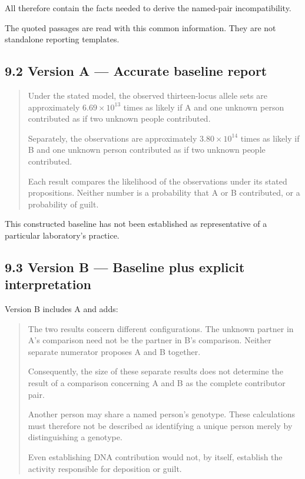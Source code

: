 \documentclass[
]{article}
\begin{document}
All therefore contain the facts needed to derive the named-pair
incompatibility.

The quoted passages are read with this common information. They are not
standalone reporting templates.

\subsection{9.2 Version A --- Accurate baseline
report}\label{version-a-accurate-baseline-report}

\begin{quote}
Under the stated model, the observed thirteen-locus allele sets are
approximately \(6.69\times10^{13}\) times as likely if A and one unknown
person contributed as if two unknown people contributed.

Separately, the observations are approximately \(3.80\times10^{14}\)
times as likely if B and one unknown person contributed as if two
unknown people contributed.

Each result compares the likelihood of the observations under its stated
propositions. Neither number is a probability that A or B contributed,
or a probability of guilt.
\end{quote}

This constructed baseline has not been established as representative of
a particular laboratory's practice.

\subsection{9.3 Version B --- Baseline plus explicit
interpretation}\label{version-b-baseline-plus-explicit-interpretation}

Version B includes A and adds:

\begin{quote}
The two results concern different configurations. The unknown partner in
A's comparison need not be the partner in B's comparison. Neither
separate numerator proposes A and B together.

Consequently, the size of these separate results does not determine the
result of a comparison concerning A and B as the complete contributor
pair.

Another person may share a named person's genotype. These calculations
must therefore not be described as identifying a unique person merely by
distinguishing a genotype.

Even establishing DNA contribution would not, by itself, establish the
activity responsible for deposition or guilt.
\end{quote}
\end{document}

